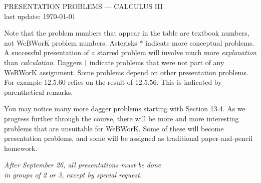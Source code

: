 \documentclass[12pt]{amsart}
\begin{document}
\begin{center}
    PRESENTATION PROBLEMS --- CALCULUS III \\ last update: \today
\end{center}

Note that the problem numbers that appear in the table are textbook numbers, 
not WeBWorK problem numbers. Asterisks $\ast$ indicate more conceptual 
problems.   A successful presentation of a starred problem will involve much
more \emph{explanation} than \emph{calculation}. Daggers $\dagger$ indicate 
problems that were not part of any WeBWorK assignment. Some problems depend 
on other presentation problems. For example 12.5.60 relies on the result of 
12.5.56. This is indicated by parenthetical remarks.

You may notice many more dagger problems starting with Section 13.4. As we
progress further through the course, there will be more and more interesting
problems that are unsuitable for WeBWorK. Some of these will become
presentation problems, and some will be assigned as traditional 
paper-and-pencil homework.

\begin{center}
    {\large \emph{After September 26, all presentations must be done\\ in groups of 2 or 3, except by special request.}}
\end{center}
\end{document}
